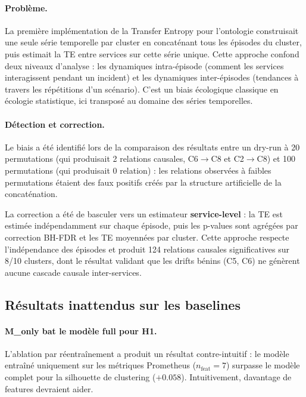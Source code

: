 \paragraph{Problème.}
La première implémentation de la Transfer Entropy pour l'ontologie construisait une
seule série temporelle par cluster en concaténant tous les épisodes du cluster,
puis estimait la TE entre services sur cette série unique.
Cette approche confond deux niveaux d'analyse : les dynamiques intra-épisode
(comment les services interagissent pendant un incident) et les dynamiques inter-épisodes
(tendances à travers les répétitions d'un scénario).
C'est un biais écologique classique en écologie statistique, ici transposé au domaine
des séries temporelles.

\paragraph{Détection et correction.}
Le biais a été identifié lors de la comparaison des résultats entre un dry-run
à 20 permutations (qui produisait 2 relations causales, C6$\to$C8 et C2$\to$C8)
et 100 permutations (qui produisait 0 relation) : les relations observées à faibles
permutations étaient des faux positifs créés par la structure artificielle de la
concaténation.

La correction a été de basculer vers un estimateur \textbf{service-level} :
la TE est estimée indépendamment sur chaque épisode, puis les p-values sont agrégées
par correction BH-FDR et les TE moyennées par cluster.
Cette approche respecte l'indépendance des épisodes et produit 124 relations causales
significatives sur 8/10 clusters, dont le résultat validant que les drifts bénins
(C5, C6) ne génèrent aucune cascade causale inter-services.

\subsection{Résultats inattendus sur les baselines}
\label{sec:diff_baselines}

\paragraph{M\_only bat le modèle full pour H1.}
L'ablation par réentraînement a produit un résultat contre-intuitif : le modèle
entraîné uniquement sur les métriques Prometheus ($n_\text{feat} = 7$) surpasse le
modèle complet pour la silhouette de clustering ($+0.058$). Intuitivement, davantage
de features devraient aider.

